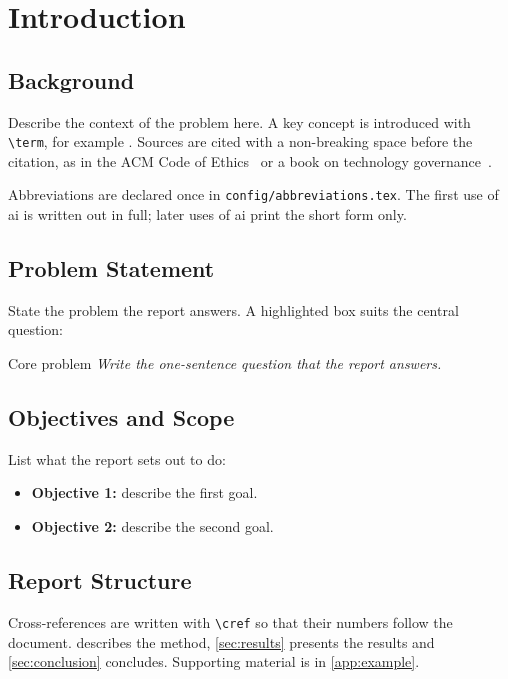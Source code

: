 \section{Introduction}\label{sec:introduction}


\subsection{Background}\label{sec:background}
Describe the context of the problem here. A key concept is introduced with \verb|\term|, for example . Sources are cited with a non-breaking space before the citation, as in the ACM Code of Ethics~\cite{acm} or a book on technology governance~\cite{collingridge}.

Abbreviations are declared once in \texttt{config/abbreviations.tex}. The first use of \ac{ai} is written out in full; later uses of \ac{ai} print the short form only.

\subsection{Problem Statement}\label{sec:problem}
State the problem the report answers. A highlighted box suits the central question:

\begin{keybox}{Core problem}
  \textit{Write the one-sentence question that the report answers.}
\end{keybox}

\subsection{Objectives and Scope}\label{sec:objectives}
List what the report sets out to do:

\begin{itemize}
  \item \textbf{Objective 1:} describe the first goal.
  \item \textbf{Objective 2:} describe the second goal.
\end{itemize}

\subsection{Report Structure}\label{sec:structure}
Cross-references are written with \verb|\cref| so that their numbers follow the document.  describes the method, \cref{sec:results} presents the results and \cref{sec:conclusion} concludes. Supporting material is in \cref{app:example}.
